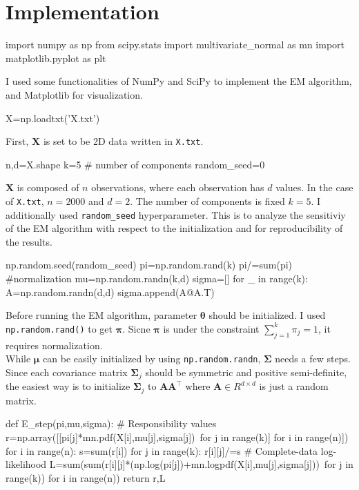 \documentclass[11pt]{article}
\begin{document}
\section{Implementation}
\begin{pythoncode*}{}
import numpy as np
from scipy.stats import multivariate_normal as mn
import matplotlib.pyplot as plt
\end{pythoncode*}
I used some functionalities of NumPy and SciPy to implement the EM algorithm, and Matplotlib for visualization.
\begin{pythoncode*}{}
X=np.loadtxt('X.txt')
\end{pythoncode*}
First, $\bm X$ is set to be 2D data written in \texttt{X.txt}.
\begin{pythoncode*}{}
n,d=X.shape
k=5 # number of components
random_seed=0
\end{pythoncode*}
$\bm X$ is composed of $n$ observations, where each observation has $d$ values. In the case of \texttt{X.txt}, $n=2000$ and $d=2$. The number of components is fixed $k=5$. I additionally used \texttt{random\_seed} hyperparameter. This is to analyze the sensitiviy of the EM algorithm with respect to the initialization and for reproducibility of the results.
\begin{pythoncode*}{}
np.random.seed(random_seed)
pi=np.random.rand(k)
pi/=sum(pi) #normalization
mu=np.random.randn(k,d)
sigma=[]
for _ in range(k):
    A=np.random.randn(d,d)
    sigma.append(A@A.T)
\end{pythoncode*}
Before running the EM algorithm, parameter $\bm\theta$ should be initialized. I used \texttt{np.random.rand()} to get $\bm\pi$. Sicne $\bm\pi$ is under the constraint $\sum_{j=1}^{k}\pi_{j}=1$, it requires normalization.\\
While $\bm\mu$ can be easily initialized by using \texttt{np.random.randn}, $\bm\Sigma$ needs a few steps. Since each covariance matrix $\bm\Sigma_{j}$ should be symmetric and positive semi-definite, the easiest way is to initialize $\bm\Sigma_{j}$ to $\bm A\bm A^{\top}$ where $\bm A\in R^{d\times d}$ is just a random matrix.
\begin{pythoncode*}{}
def E_step(pi,mu,sigma):
    # Responsibility values
    r=np.array([[pi[j]*mn.pdf(X[i],mu[j],sigma[j])\
                for j in range(k)] for i in range(n)])
    for i in range(n):
        s=sum(r[i])
        for j in range(k):
            r[i][j]/=s
    # Complete-data log-likelihood
    L=sum(sum(r[i][j]*(np.log(pi[j])+mn.logpdf(X[i],mu[j],sigma[j]))\
                                for j in range(k)) for i in range(n))
    return r,L
\end{pythoncode*}
\end{document}
